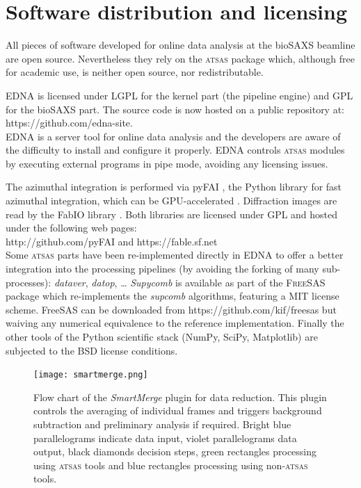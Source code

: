 \documentclass[preprint,pdf]{iucr}              %
\begin{document}
\section{Software distribution and licensing}

All pieces of software developed for online data analysis at the bioSAXS
beamline are open source.
Nevertheless they rely on the \textsc{atsas} package which, although free
for academic use, is neither open source, nor redistributable.

EDNA is licensed under LGPL for the kernel part (the pipeline engine) and GPL
for the bioSAXS part. The source code is now hosted on a public
repository at:\\
https://github.com/edna-site.\\
EDNA is a server tool for online data analysis and the developers are aware of
the difficulty to install and configure it properly. EDNA controls
\textsc{atsas} modules by executing external programs in pipe mode, avoiding
any licensing issues.

The azimuthal integration is performed via pyFAI \cite{pyFAI}, the Python library
for fast azimuthal integration, which can be GPU-accelerated
\cite{pyFAI_2015}.
Diffraction images are read by the FabIO library \cite{fabio}.
Both libraries are licensed under GPL and hosted under the following web
pages:\\
http://github.com/pyFAI and https://fable.sf.net\\
Some \textsc{atsas} parts have been re-implemented  directly in EDNA  
to offer a better integration into the processing pipelines (by avoiding the
forking of many sub-processes): \textit{dataver}, \textit{datop}, \ldots 
\textit{Supycomb} is available as part of the \textsc{FreeSAS} package which
re-implements the \textit{supcomb} algorithms, featuring a MIT license scheme. 
FreeSAS can be downloaded from
https://github.com/kif/freesas but waiving any numerical equivalence to the
reference implementation.
Finally the other tools of the Python scientific stack (NumPy, SciPy,
Matplotlib) are subjected to the BSD license conditions.


\begin{figure}
\centering
\texttt{[image: smartmerge.png]}%
\caption{Flow chart of the \textit{SmartMerge} plugin for data reduction.
This plugin controls the averaging of individual frames and triggers background
subtraction and preliminary analysis if required.
Bright blue parallelograms indicate data input, violet parallelograms data
output, black diamonds decision steps, green rectangles processing using
\textsc{atsas} tools and blue rectangles processing using non-\textsc{atsas} tools. }
\label{fgr:smart}
\end{figure}
\end{document}
